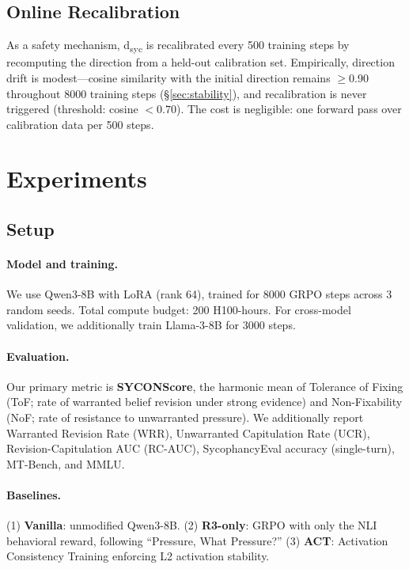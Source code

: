 \documentclass[11pt,a4paper]{article}
\begin{document}
\subsection{Online Recalibration}
\label{sec:recalib}

As a safety mechanism, d\textsubscript{syc} is recalibrated every 500 training steps by recomputing the direction from a held-out calibration set.
Empirically, direction drift is modest---cosine similarity with the initial direction remains $\geq$0.90 throughout 8000 training steps (\S\ref{sec:stability}), and recalibration is never triggered (threshold: cosine $< 0.70$).
The cost is negligible: one forward pass over calibration data per 500 steps.

\section{Experiments}
\label{sec:experiments}

\subsection{Setup}

\paragraph{Model and training.}
We use Qwen3-8B with LoRA (rank 64), trained for 8000 GRPO steps across 3 random seeds.
Total compute budget: 200 H100-hours.
For cross-model validation, we additionally train Llama-3-8B for 3000 steps.

\paragraph{Evaluation.}
Our primary metric is \textbf{SYCONScore}, the harmonic mean of Tolerance of Fixing (ToF; rate of warranted belief revision under strong evidence) and Non-Fixability (NoF; rate of resistance to unwarranted pressure).
We additionally report Warranted Revision Rate (WRR), Unwarranted Capitulation Rate (UCR), Revision-Capitulation AUC (RC-AUC), SycophancyEval accuracy (single-turn), MT-Bench, and MMLU.

\paragraph{Baselines.}
(1) \textbf{Vanilla}: unmodified Qwen3-8B.
(2) \textbf{R3-only}: GRPO with only the NLI behavioral reward, following ``Pressure, What Pressure?''
(3) \textbf{ACT}: Activation Consistency Training enforcing L2 activation stability.
\end{document}
